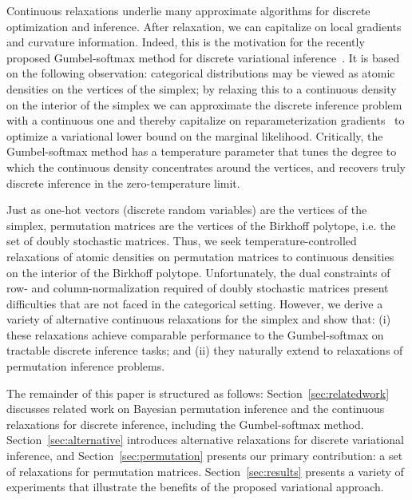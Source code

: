 Continuous relaxations underlie many approximate algorithms for
discrete optimization and inference.  After relaxation, we can
capitalize on local gradients and curvature information. Indeed, this
is the motivation for the recently proposed Gumbel-softmax method for
discrete variational inference~\citep{jang2016categorical,
  maddison2016concrete}.  It is based on the following observation:
categorical distributions may be viewed as atomic densities
on the vertices of the simplex; by relaxing this to a continuous
density on the interior of the simplex we can approximate the discrete
inference problem with a continuous one and thereby capitalize on
reparameterization gradients~\citep{Kingma2014, rezende2014stochastic}
to optimize a variational lower bound on the marginal likelihood.
Critically, the Gumbel-softmax method has a temperature parameter that
tunes the degree to which the continuous density concentrates around
the vertices, and recovers truly discrete inference in the
zero-temperature limit.

Just as one-hot vectors (discrete random variables) are the vertices
of the simplex, permutation matrices are the vertices of the Birkhoff
polytope, i.e. the set of doubly stochastic matrices.  Thus, we seek
temperature-controlled relaxations of atomic densities on permutation
matrices to continuous densities on the interior of the Birkhoff
polytope.  Unfortunately, the dual constraints of row- and
column-normalization required of doubly stochastic matrices present
difficulties that are not faced in the categorical setting. However,
we derive a variety of alternative continuous relaxations for the
simplex and show that: (i) these relaxations achieve comparable
performance to the Gumbel-softmax on tractable discrete inference
tasks; and (ii) they naturally extend to relaxations of permutation
inference problems.

The remainder of this paper is structured as follows:
Section~\ref{sec:relatedwork} discusses related work on Bayesian
permutation inference and the continuous relaxations for discrete
inference, including the Gumbel-softmax method.
Section~\ref{sec:alternative} introduces alternative relaxations for
discrete variational inference, and Section~\ref{sec:permutation}
presents our primary contribution: a set of relaxations for
permutation matrices. Section~\ref{sec:results} presents a variety of
experiments that illustrate the benefits of the proposed variational
approach.
  

